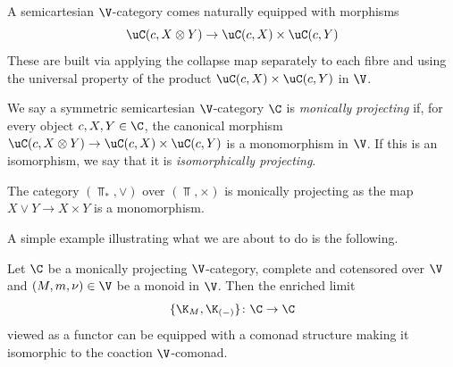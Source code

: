 \documentclass{tac}
\def\bTop{{\Top_\ast}}
\begin{document}
A semicartesian $\V$-category comes naturally equipped with morphisms
$$
 \uC(c, X \otimes Y) \to \uC(c, X) \times \uC(c, Y)
$$ 
These are built via applying the collapse map separately to each fibre and using the universal property of the product $\uC(c, X) \times \uC(c, Y)$ in $\V$.
\begin{definition}
\label{def:monicallyprojecting}
    We say a symmetric semicartesian $\V$-category $\C$ is \emph{monically projecting} if, for every object $c, X, Y \in \C$, the canonical morphism $\uC(c, X\otimes Y) \to  \uC(c, X)\times\uC(c, Y) $ is a monomorphism in $\V$. If this is an isomorphism, we say that it is \emph{isomorphically projecting}.
\end{definition}
\begin{example}
    The category $(\bTop, \vee)$ over  $(\Top, \times)$ is monically projecting as the map $X\vee Y \to X\times Y$ is a monomorphism.
\end{example}
A simple example illustrating what we are about to do is the following.
\begin{proposition}
\label{prop:monoidcase}
    Let $\C$ be a monically projecting $\V$-category, complete and cotensored over $\V$ and $(M,m, \nu)\in\V$ be a monoid in $\V$. Then the enriched limit 
    $$
    \{\K_M, \K_{(-)}\} \colon \C \to \C
    $$
    viewed as a functor can be equipped with a comonad structure making it isomorphic to the coaction $\V$-comonad.
\end{proposition}
\end{document}
